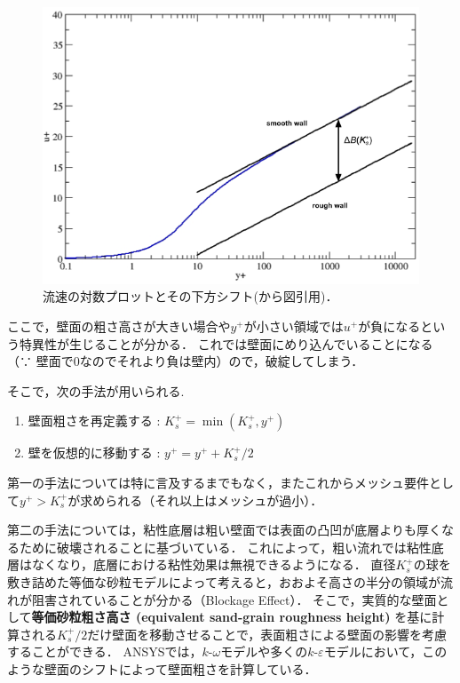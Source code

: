 \documentclass[uplatex,dvipdfmx,a4j,12pt]{jsarticle}
\begin{document}
\begin{figure}[H]
  \centering
  \includegraphics[width=0.8\linewidth]{wall_function/img/g_flu_ug_wall_rough_shift.png}
  \caption{流速の対数プロットとその下方シフト(\cite{wall_model}から図引用)．}
  \label{fig:wall_function}
\end{figure}

ここで，壁面の粗さ高さが大きい場合や$y^+$が小さい領域では$u^+$が負になるという特異性が生じることが分かる． 
これでは壁面にめり込んでいることになる（∵ 壁面で0なのでそれより負は壁内）ので，破綻してしまう．

そこで，次の手法が用いられる.

\begin{enumerate}
  \item 壁面粗さを再定義する : $K_s^+ = \min(K_s^+, y^+)$
  \item 壁を仮想的に移動する : $y^+ = y^+ + K_s^+ / 2$
\end{enumerate}

第一の手法については特に言及するまでもなく，またこれからメッシュ要件として$y^+ > K_s^+$が求められる（それ以上はメッシュが過小）．

第二の手法については，粘性底層は粗い壁面では表面の凸凹が底層よりも厚くなるために破壊されることに基づいている．
これによって，粗い流れでは粘性底層はなくなり，底層における粘性効果は無視できるようになる．
直径$K_s^+$の球を敷き詰めた等価な砂粒モデルによって考えると，おおよそ高さの半分の領域が流れが阻害されていることが分かる（Blockage Effect）．
そこで，実質的な壁面として\textbf{等価砂粒粗さ高さ (equivalent sand-grain roughness height)} を基に計算される$K_s^+ / 2$だけ壁面を移動させることで，表面粗さによる壁面の影響を考慮することができる．
ANSYSでは，$k$-$\omega$モデルや多くの$k$-$\varepsilon$モデルにおいて，このような壁面のシフトによって壁面粗さを計算している．
\end{document}

